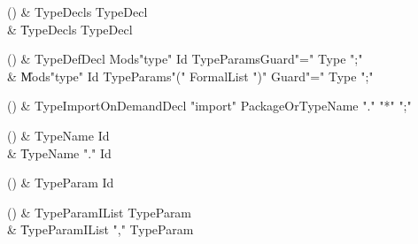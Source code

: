 \begin{bbgrammarappendix}

() & TypeDecls \label{prod:TypeDecls}  \: TypeDecl  \\

 &    \| TypeDecls TypeDecl \\

\end{bbgrammarappendix}

\begin{bbgrammarappendix}

() & TypeDefDecl \label{prod:TypeDefDecl}  \: Mods\opt \xcd"type" Id TypeParams\opt Guard\opt \xcd"=" Type \xcd";"  \\

 &    \| Mods\opt \xcd"type" Id TypeParams\opt \xcd"(" FormalList \xcd")" Guard\opt \xcd"=" Type \xcd";" \\

\end{bbgrammarappendix}

\begin{bbgrammarappendix}

() & TypeImportOnDemandDecl \label{prod:TypeImportOnDemandDecl}  \: \xcd"import" PackageOrTypeName \xcd"." \xcd"*" \xcd";"  \\


\end{bbgrammarappendix}

\begin{bbgrammarappendix}

() & TypeName \label{prod:TypeName}  \: Id  \\

 &    \| TypeName \xcd"." Id \\

\end{bbgrammarappendix}

\begin{bbgrammarappendix}

() & TypeParam \label{prod:TypeParam}  \: Id  \\


\end{bbgrammarappendix}

\begin{bbgrammarappendix}

() & TypeParamIList \label{prod:TypeParamIList}  \: TypeParam  \\

 &    \| TypeParamIList \xcd"," TypeParam \\

\end{bbgrammarappendix}

